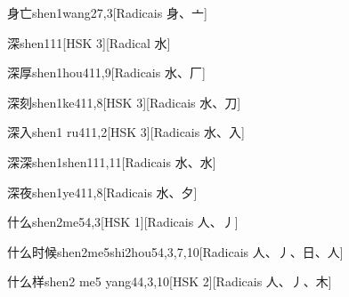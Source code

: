 \begin{entry}{身亡}{shen1wang2}{7,3}[Radicais ⾝、⼇]
\end{entry}

\begin{entry}{深}{shen1}{11}[HSK 3][Radical ⽔]
\end{entry}

\begin{entry}{深厚}{shen1hou4}{11,9}[Radicais ⽔、⼚]
\end{entry}

\begin{entry}{深刻}{shen1ke4}{11,8}[HSK 3][Radicais ⽔、⼑]
\end{entry}

\begin{entry}{深入}{shen1 ru4}{11,2}[HSK 3][Radicais ⽔、⼊]
\end{entry}

\begin{entry}{深深}{shen1shen1}{11,11}[Radicais ⽔、⽔]
\end{entry}

\begin{entry}{深夜}{shen1ye4}{11,8}[Radicais ⽔、⼣]
\end{entry}

\begin{entry}{什么}{shen2me5}{4,3}[HSK 1][Radicais ⼈、⼃]
\end{entry}

\begin{entry}{什么时候}{shen2me5shi2hou5}{4,3,7,10}[Radicais ⼈、⼃、⽇、⼈]
\end{entry}

\begin{entry}{什么样}{shen2 me5 yang4}{4,3,10}[HSK 2][Radicais ⼈、⼃、⽊]
\end{entry}

